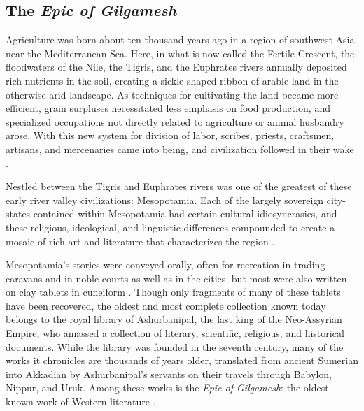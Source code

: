 \documentclass[10pt,a4paper]{article}
\begin{document}
\subsection{The \emph{Epic of Gilgamesh}}
%
%
Agriculture was born about ten thousand years ago in a region of southwest Asia near the Mediterranean Sea. Here, in what is now called the Fertile Crescent, the floodwaters of the Nile, the Tigris, and the Euphrates rivers annually deposited rich nutrients in the soil, creating a sickle-shaped ribbon of arable land in the otherwise arid landscape. As techniques for cultivating the land became more efficient, grain surpluses necessitated less emphasis on food production, and specialized occupations not directly related to agriculture or animal husbandry arose. With this new system for division of labor, scribes, priests, craftsmen, artisans, and mercenaries came into being, and civilization followed in their wake \cite{nelson2015}. 

Nestled between the Tigris and Euphrates rivers was one of the greatest of these early river valley civilizations: Mesopotamia. Each of the largely sovereign city-states contained within Mesopotamia had certain cultural idiosyncrasies, and these religious, ideological, and linguistic differences compounded to create a mosaic of rich art and literature that characterizes the region \cite{van1997ancient}. 

Mesopotamia’s stories were conveyed orally, often for recreation in trading caravans and in noble courts as well as in the cities, but most were also written on clay tablets in cuneiform \cite{dalley2000myths}. Though only fragments of many of these tablets have been recovered, the oldest and most complete collection known today belongs to the royal library of Ashurbanipal, the last king of the Neo-Assyrian Empire, who amassed a collection of literary, scientific, religious, and historical documents. While the library was founded in the seventh century, many of the works it chronicles are thousands of years older, translated from ancient Sumerian into Akkadian by Ashurbanipal’s servants on their travels through Babylon, Nippur, and Uruk. Among these works is the \emph{Epic of Gilgamesh}: the oldest known work of Western literature \cite{sandars1972epic}.
%
%
\end{document}
